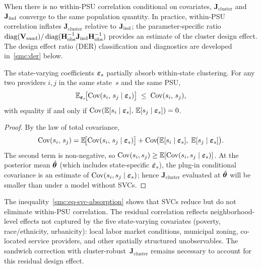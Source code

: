 \begin{remark}
\label{smc:rem-J-comparison}
  When there is no within-PSU correlation conditional on covariates,
  $\mathbf{J}_{\mathrm{cluster}}$ and $\mathbf{J}_{\textup{ind}}$
  converge to the same population quantity.  In practice, within-PSU
  correlation inflates $\mathbf{J}_{\mathrm{cluster}}$ relative to
  $\mathbf{J}_{\textup{ind}}$; the parameter-specific ratio
  $\operatorname{diag}(\mathbf{V}_{\mathrm{sand}})
  / \operatorname{diag}(\mathbf{H}_{\mathrm{obs}}^{-1}
           \mathbf{J}_{\textup{ind}}
           \mathbf{H}_{\mathrm{obs}}^{-1})$
  provides an estimate of the cluster design effect.
  The design effect ratio (DER) classification and diagnostics are
  developed in~\cref{smc:der} below.
\end{remark}


\begin{proposition}
\label{smc:prop-svc-absorption}
  The state-varying coefficients $\boldsymbol{\varepsilon}_s$ partially absorb
  within-state clustering.  For any two providers $i,j$ in the same
  state~$s$ and the same PSU,
  \begin{equation}\label{smc:eq-svc-absorption}
    \mathbb{E}_{\boldsymbol{\varepsilon}_s}\!\bigl[
      \operatorname*{Cov}(s_i,\,s_j \mid \boldsymbol{\varepsilon}_s)
    \bigr]
    \;\leq\;
    \operatorname*{Cov}(s_i,\,s_j),
  \end{equation}
  with equality if and only if $\operatorname*{Cov}(\mathbb{E}[s_i \mid \boldsymbol{\varepsilon}_s],\,
  \mathbb{E}[s_j \mid \boldsymbol{\varepsilon}_s]) = 0$.
\end{proposition}

\begin{proof}
  By the law of total covariance,
  \[
    \operatorname*{Cov}(s_i,\,s_j)
    = \mathbb{E}\!\bigl[\operatorname*{Cov}(s_i,\,s_j \mid \boldsymbol{\varepsilon}_s)\bigr]
    + \operatorname*{Cov}\!\bigl(
        \mathbb{E}[s_i \mid \boldsymbol{\varepsilon}_s],\;
        \mathbb{E}[s_j \mid \boldsymbol{\varepsilon}_s]
      \bigr).
  \]
  The second term is non-negative, so
  $\operatorname*{Cov}(s_i,s_j) \geq \mathbb{E}[\operatorname*{Cov}(s_i,s_j \mid \boldsymbol{\varepsilon}_s)]$.
  At the posterior mean $\hat{\boldsymbol{\theta}}$ (which includes state-specific
  $\hat{\boldsymbol{\varepsilon}}_s$), the plug-in conditional covariance is an estimate
  of $\operatorname*{Cov}(s_i,s_j \mid \boldsymbol{\varepsilon}_s)$; hence
  $\mathbf{J}_{\mathrm{cluster}}$ evaluated at $\hat{\boldsymbol{\theta}}$ will
  be smaller than under a model without SVCs.
\end{proof}

\begin{remark}
\label{smc:rem-residual-clustering}
  The inequality~\eqref{smc:eq-svc-absorption} shows that SVCs reduce
  but do not eliminate within-PSU correlation.  The residual correlation
  reflects neighborhood-level effects not captured by the five
  state-varying covariates (poverty, race/ethnicity, urbanicity): local
  labor market conditions, municipal zoning, co-located service
  providers, and other spatially structured unobservables.  The sandwich
  correction with cluster-robust~$\mathbf{J}_{\mathrm{cluster}}$ remains
  necessary to account for this residual design effect.
\end{remark}

